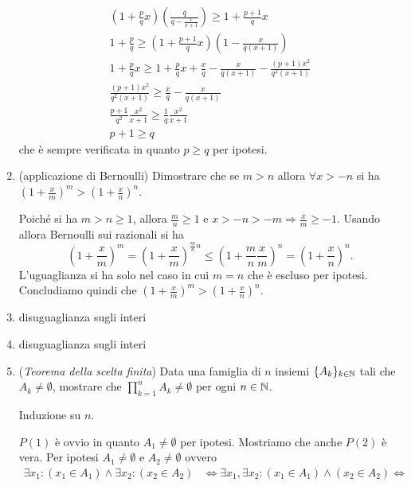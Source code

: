 \documentclass[a4paper]{article}\par \usepackage{style}\par
\begin{document}
\begin{enumerate}
\begin{pind}
    \begin{gather*}
      \left(1 + \frac{p}{q}x\right)\left(\frac{q}{q - \frac{x}{x + 1}}\right) \geq 1 + \frac{p + 1}{q}x \\
      1 + \frac{p}{q} \geq \left(1 + \frac{p + 1}{q}x\right)\left(1 - \frac{x}{q(x + 1)}\right) \\
      1 + \frac{p}{q}x \geq 1 + \frac{p}{q}x + \frac{x}{q} - \frac{x}{q(x + 1)} - \frac{(p + 1)x^2}{q^2(x + 1)} \\
      \frac{(p + 1)x^2}{q^2(x + 1)} \geq \frac{x}{q} - \frac{x}{q(x + 1)} \\
      \frac{p + 1}{q^2} \frac{x^2}{x + 1} \geq \frac{1}{q} \frac{x^2}{x + 1} \\
      p + 1 \geq q
    \end{gather*}
    che è sempre verificata in quanto $ p \geq q $ per ipotesi.
  \end{pind}
\item (applicazione di Bernoulli) Dimostrare che se $ m > n $ allora $ \forall x > -n $ si ha $ \left(1 + \frac{x}{m}\right)^m > \left(1 + \frac{x}{n}\right)^n $.\\\par   Poiché si ha $ m > n \geq 1 $, allora $ \frac{m}{n} \geq 1 $ e $ x > -n > -m \Rightarrow \frac{x}{m} \geq -1 $. Usando allora Bernoulli sui razionali si ha \[\left(1 + \frac{x}{m}\right)^m = \left(1 + \frac{x}{m}\right)^{\frac{m}{n} n} \leq \left(1 + \frac{m}{n}\frac{x}{m}\right)^n = \left(1 + \frac{x}{n}\right)^n.\] L'uguaglianza si ha solo nel caso in cui $ m = n $ che è escluso per ipotesi. Concludiamo quindi che $ \left(1 + \frac{x}{m}\right)^m > \left(1 + \frac{x}{n}\right)^n $.
\item \textsf{disuguaglianza sugli interi}
\item \textsf{disuguaglianza sugli interi}
\item (\emph{Teorema della scelta finita}) Data una famiglia di $ n $ insiemi $ \{A_k\}_{k \in \mathbb{N}} $ tali che $ A_k \neq \emptyset $, mostrare che $ \prod_{k = 1}^{n} A_k \neq \emptyset $ per ogni $ n \in \mathbb{N} $. \\\par   Induzione su $ n $.
  \begin{pbase}
    $ P(1) $ è ovvio in quanto $ A_1 \neq \emptyset $ per ipotesi. Mostriamo che anche $ P(2) $ è vera. Per ipotesi $ A_1 \neq \emptyset $ e $ A_2 \neq \emptyset $ ovvero
    \begin{align*}
      \exists x_1 : (x_1 \in A_1) \wedge \exists x_2 : (x_2 \in A_2) & \iff \exists x_1, \exists x_2 : (x_1 \in A_1) \wedge (x_2 \in A_2) \iff \\

\end{align*}
\end{pbase}
\end{enumerate}
\end{document}
